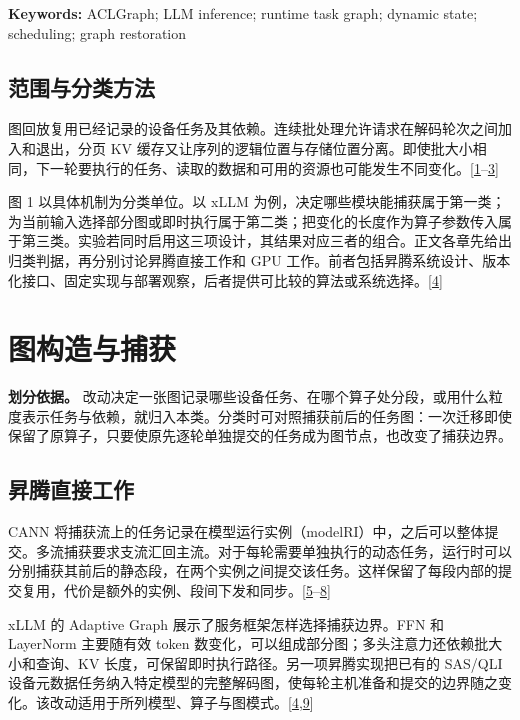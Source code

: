 \documentclass[
  UTF8,
  zihao=5]{ctexart}
\begin{document}
\textbf{Keywords:} ACLGraph; LLM inference; runtime task graph; dynamic
state; scheduling; graph restoration

\hypertarget{ux8303ux56f4ux4e0eux5206ux7c7bux65b9ux6cd5}{%
\subsection*{范围与分类方法}\label{ux8303ux56f4ux4e0eux5206ux7c7bux65b9ux6cd5}}

图回放复用已经记录的设备任务及其依赖。连续批处理允许请求在解码轮次之间加入和退出，分页
KV
缓存又让序列的逻辑位置与存储位置分离。即使批大小相同，下一轮要执行的任务、读取的数据和可用的资源也可能发生不同变化。{[}\protect\hyperlink{ref-yu2022orca}{1}--\protect\hyperlink{ref-zheng2024sglang}{3}{]}

图 1 以具体机制为分类单位。以 xLLM
为例，决定哪些模块能捕获属于第一类；为当前输入选择部分图或即时执行属于第二类；把变化的长度作为算子参数传入属于第三类。实验若同时启用这三项设计，其结果对应三者的组合。正文各章先给出归类判据，再分别讨论昇腾直接工作和
GPU
工作。前者包括昇腾系统设计、版本化接口、固定实现与部署观察，后者提供可比较的算法或系统选择。{[}\protect\hyperlink{ref-liu2025xllm}{4}{]}

\hypertarget{capture}{%
\section{图构造与捕获}\label{capture}}

\textbf{划分依据。}
改动决定一张图记录哪些设备任务、在哪个算子处分段，或用什么粒度表示任务与依赖，就归入本类。分类时可对照捕获前后的任务图：一次迁移即使保留了原算子，只要使原先逐轮单独提交的任务成为图节点，也改变了捕获边界。

\hypertarget{ux6607ux817eux76f4ux63a5ux5de5ux4f5c}{%
\subsection{昇腾直接工作}\label{ux6607ux817eux76f4ux63a5ux5de5ux4f5c}}

CANN
将捕获流上的任务记录在模型运行实例（modelRI）中，之后可以整体提交。多流捕获要求支流汇回主流。对于每轮需要单独执行的动态任务，运行时可以分别捕获其前后的静态段，在两个实例之间提交该任务。这样保留了每段内部的提交复用，代价是额外的实例、段间下发和同步。{[}\protect\hyperlink{ref-cann900overview}{5}--\protect\hyperlink{ref-cann910update}{8}{]}

xLLM 的 Adaptive Graph 展示了服务框架怎样选择捕获边界。FFN 和 LayerNorm
主要随有效 token
数变化，可以组成部分图；多头注意力还依赖批大小和查询、KV
长度，可保留即时执行路径。另一项昇腾实现把已有的 SAS/QLI
设备元数据任务纳入特定模型的完整解码图，使每轮主机准备和提交的边界随之变化。该改动适用于所列模型、算子与图模式。{[}\protect\hyperlink{ref-liu2025xllm}{4},\protect\hyperlink{ref-vllmascendpr21259}{9}{]}
\end{document}
